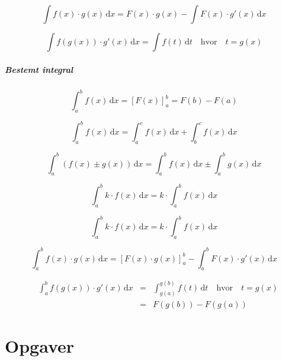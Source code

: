 \documentclass[11pt,a5paper,fleqn,leqno]{book}
\begin{document}
\begin{equation}
\int f(x) \cdot g(x)\, \mathrm{d}x = F(x) \cdot g(x) -  \int F(x) \cdot g'(x)\, \mathrm{d}x
\end{equation}

\begin{equation}
\int f(g(x)) \cdot g'(x)\, \mathrm{d}x = \int f(t)\, \mathrm{d}t \quad \mbox{hvor} \quad t = g(x)
\end{equation}

\paragraph{Bestemt integral}

\begin{equation}
\int_a^b f(x)\, \mathrm{d}x = \left[F(x)\right]_a^b = F(b) - F(a)
\end{equation}

\begin{equation}
\int_a^b f(x)\, \mathrm{d}x = \int_a^c f(x)\, \mathrm{d}x + \int_b^c f(x)\, \mathrm{d}x
\end{equation}

\begin{equation}
\int_a^b \left(f(x) \pm g(x)\right)\, \mathrm{d}x = \int_a^b f(x)\, \mathrm{d}x \pm \int_a^b g(x)\, \mathrm{d}x
\end{equation}

\begin{equation}
\int_a^b k \cdot f(x)\, \mathrm{d}x = k \cdot \int_a^b f(x)\, \mathrm{d}x
\end{equation}

\begin{equation}
\int_a^b k \cdot f(x)\, \mathrm{d}x = k \cdot \int_a^b f(x)\, \mathrm{d}x
\end{equation}

\begin{equation}
\int_a^b f(x) \cdot g(x)\, \mathrm{d}x = \left[F(x) \cdot g(x) \right]_a^b - \int_a^b F(x) \cdot g'(x)\, \mathrm{d}x
\end{equation}

\begin{eqnarray}
\quad \int_a^b f(g(x)) \cdot g'(x)\, \mathrm{d}x & = & \int_{g(a)}^{g(b)} f(t)\, \mathrm{d}t  \quad \mbox{hvor} \quad t = g(x) \\
 & = & F(g(b)) - F(g(a)) \nonumber
\end{eqnarray}

\chapter{Opgaver} \label{ch:Opgaver}
\end{document}
